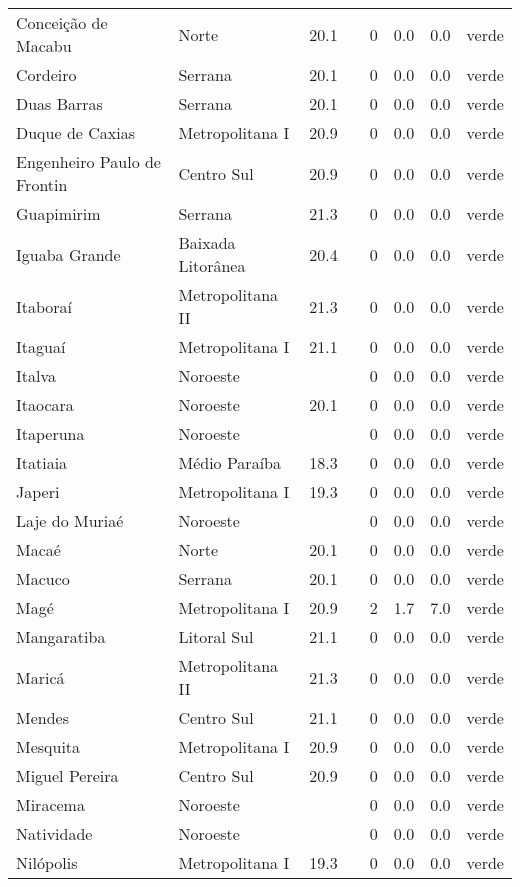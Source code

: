 \begin{longtable}{l|lllllll}
  Conceição de Macabu & Norte & 20.1 &  & 0 & 0.0 & 0.0 & verde \\ 
  Cordeiro & Serrana & 20.1 &  & 0 & 0.0 & 0.0 & verde \\ 
  Duas Barras & Serrana & 20.1 &  & 0 & 0.0 & 0.0 & verde \\ 
  Duque de Caxias & Metropolitana I & 20.9 &  & 0 & 0.0 & 0.0 & verde \\ 
  Engenheiro Paulo de Frontin & Centro Sul & 20.9 &  & 0 & 0.0 & 0.0 & verde \\ 
  Guapimirim & Serrana & 21.3 &  & 0 & 0.0 & 0.0 & verde \\ 
  Iguaba Grande & Baixada Litorânea & 20.4 &  & 0 & 0.0 & 0.0 & verde \\ 
  Itaboraí & Metropolitana II & 21.3 &  & 0 & 0.0 & 0.0 & verde \\ 
  Itaguaí & Metropolitana I & 21.1 &  & 0 & 0.0 & 0.0 & verde \\ 
  Italva & Noroeste &  &  & 0 & 0.0 & 0.0 & verde \\ 
  Itaocara & Noroeste & 20.1 &  & 0 & 0.0 & 0.0 & verde \\ 
  Itaperuna & Noroeste &  &  & 0 & 0.0 & 0.0 & verde \\ 
  Itatiaia & Médio Paraíba & 18.3 &  & 0 & 0.0 & 0.0 & verde \\ 
  Japeri & Metropolitana I & 19.3 &  & 0 & 0.0 & 0.0 & verde \\ 
  Laje do Muriaé & Noroeste &  &  & 0 & 0.0 & 0.0 & verde \\ 
  Macaé & Norte & 20.1 &  & 0 & 0.0 & 0.0 & verde \\ 
  Macuco & Serrana & 20.1 &  & 0 & 0.0 & 0.0 & verde \\ 
  Magé & Metropolitana I & 20.9 &  & 2 & 1.7 & 7.0 & verde \\ 
  Mangaratiba & Litoral Sul & 21.1 &  & 0 & 0.0 & 0.0 & verde \\ 
  Maricá & Metropolitana II & 21.3 &  & 0 & 0.0 & 0.0 & verde \\ 
  Mendes & Centro Sul & 21.1 &  & 0 & 0.0 & 0.0 & verde \\ 
  Mesquita & Metropolitana I & 20.9 &  & 0 & 0.0 & 0.0 & verde \\ 
  Miguel Pereira & Centro Sul & 20.9 &  & 0 & 0.0 & 0.0 & verde \\ 
  Miracema & Noroeste &  &  & 0 & 0.0 & 0.0 & verde \\ 
  Natividade & Noroeste &  &  & 0 & 0.0 & 0.0 & verde \\ 
  Nilópolis & Metropolitana I & 19.3 &  & 0 & 0.0 & 0.0 & verde \\ 

\end{longtable}
